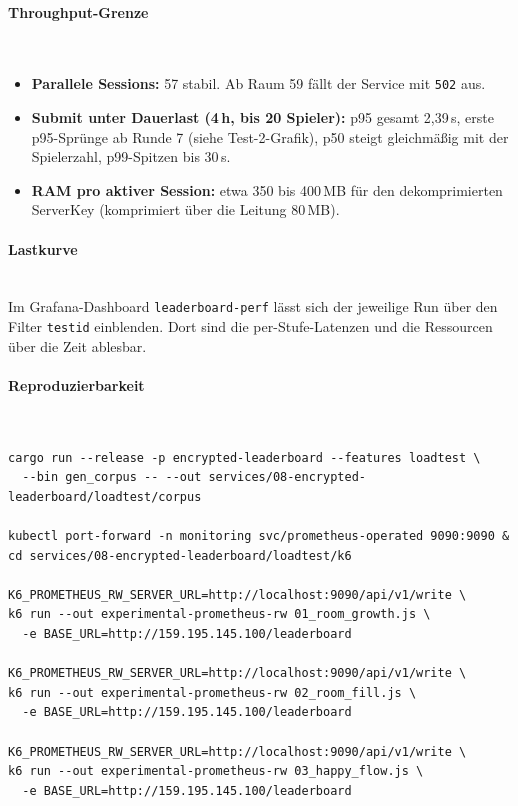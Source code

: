 \paragraph{Throughput-Grenze}\mbox{}\\
\begin{itemize}
    \item \textbf{Parallele Sessions:} 57 stabil. Ab Raum 59 fällt der Service mit \texttt{502} aus.
    \item \textbf{Submit unter Dauerlast (4\,h, bis 20 Spieler):} p95 gesamt 2{,}39\,s, erste p95-Sprünge ab Runde 7 (siehe Test-2-Grafik), p50 steigt gleichmäßig mit der Spielerzahl, p99-Spitzen bis 30\,s.
    \item \textbf{RAM pro aktiver Session:} etwa 350 bis 400\,MB für den dekomprimierten ServerKey (komprimiert über die Leitung 80\,MB).
\end{itemize}

\paragraph{Lastkurve}\mbox{}\\
Im Grafana-Dashboard \texttt{leaderboard-perf} lässt sich der jeweilige Run über den Filter \texttt{testid} einblenden. Dort sind die per-Stufe-Latenzen und die Ressourcen über die Zeit ablesbar.

\paragraph{Reproduzierbarkeit}\mbox{}\\
\begin{lstlisting}[basicstyle=\ttfamily\footnotesize,breaklines=true]
cargo run --release -p encrypted-leaderboard --features loadtest \
  --bin gen_corpus -- --out services/08-encrypted-leaderboard/loadtest/corpus

kubectl port-forward -n monitoring svc/prometheus-operated 9090:9090 &
cd services/08-encrypted-leaderboard/loadtest/k6

K6_PROMETHEUS_RW_SERVER_URL=http://localhost:9090/api/v1/write \
k6 run --out experimental-prometheus-rw 01_room_growth.js \
  -e BASE_URL=http://159.195.145.100/leaderboard

K6_PROMETHEUS_RW_SERVER_URL=http://localhost:9090/api/v1/write \
k6 run --out experimental-prometheus-rw 02_room_fill.js \
  -e BASE_URL=http://159.195.145.100/leaderboard

K6_PROMETHEUS_RW_SERVER_URL=http://localhost:9090/api/v1/write \
k6 run --out experimental-prometheus-rw 03_happy_flow.js \
  -e BASE_URL=http://159.195.145.100/leaderboard
\end{lstlisting}

